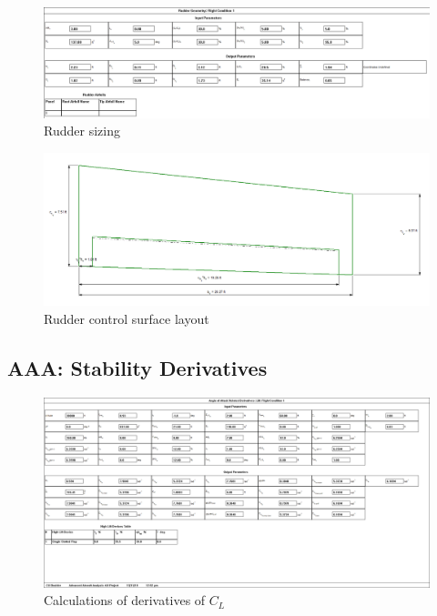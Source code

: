 \documentclass[conf]{new-aiaa}
\begin{document}
\begin{figure}[H]
    \includegraphics[width=\textwidth]{Report3Printouts/Empannage/Vertical_rudder_cropped.png}
    \caption{Rudder sizing}
    \label{fig:vertical_rudder}
\end{figure}

\begin{figure}[H]
    \includegraphics[width=\textwidth]{Report3Printouts/Empannage/Vertical_rudder_plot.png}
    \caption{Rudder control surface layout}
    \label{fig:vertical_rudder_plot}
\end{figure}


\subsection{AAA: Stability Derivatives}

\begin{figure}[H]
    \includegraphics[width=\textwidth]{Report3Printouts/Stability/CL_alpha.png}
    \caption{Calculations of derivatives of $C_L$}
    \label{fig:cl_alpha}
\end{figure}
\end{document}
